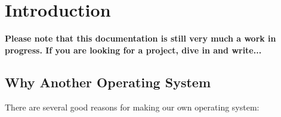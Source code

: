 \chapter{Introduction}



\textbf{Please note that this documentation is still very much a work in
progress. If you are looking for a project, dive in and write...}

\section{Why Another Operating System}

There are several good reasons for making our own operating system:


